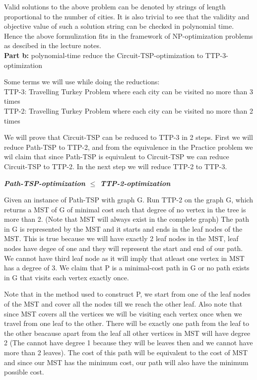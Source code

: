 \documentclass[8pt]{article}
\begin{document}
Valid solutions to the above problem can be denoted by strings of length proportional to the number of cities. It is
also trivial to see that the validity and objective value of such a solution string can be checked in polynomial time.
Hence the above formulization fits in the framework of NP-optimization problems as descibed in the lecture notes. \\

\textbf{Part b:} polynomial-time reduce the Circuit-TSP-optimization to TTP-3-optimization

Some terms we will use while doing the reductions: \\
TTP-3: Travelling Turkey Problem where each city can be visited no more than 3 times \\
TTP-2: Travelling Turkey Problem where each city can be visited no more than 2 times

We will prove that Circuit-TSP can be reduced to TTP-3 in 2 steps. First we will reduce Path-TSP to TTP-2, and from 
the equivalence in the Practice problem we wil claim that since Path-TSP is equivalent to Circuit-TSP we can reduce
Circuit-TSP to TTP-2. In the next step we will reduce TTP-2 to TTP-3.

\textbf{\textit{Path-TSP-optimization $\leq$ TTP-2-optimization}}

Given an instance of Path-TSP with graph G. Run TTP-2 on the graph G, 
which returns a MST of G of minimal cost such that degree of no vertex in the tree is more than 2.
(Note that MST will always exist in the complete graph) The path in G is represented by the MST and it starts and 
ends in the leaf nodes of the MST. This is true because we will have exactly 2 leaf nodes in the MST, leaf nodes have degee of one and they
will represent the start and end of our path. We cannot have third leaf node as it will imply that atleast
one vertex in MST has a degree of 3. We claim that P is a minimal-cost path in G or no path exists in G that
visits each vertex exactly once.

Note that in the method used to construct P, we start from one of the leaf nodes of the MST and cover
all the nodes till we reach the other leaf. Also note that since MST covers all the vertices we will
be visiting each vertex once when we travel from one leaf to the other. There will be exactly one path
from the leaf to the other beacause apart from the leaf all other vertices in MST will have degree 2
(The cannot have degree 1 because they will be leaves then and we cannot have more than 2 leaves).
The cost of this path will be equivalent to the cost of MST and since our MST has the minimum cost, our
path will also have the minimum possible cost.
\end{document}
